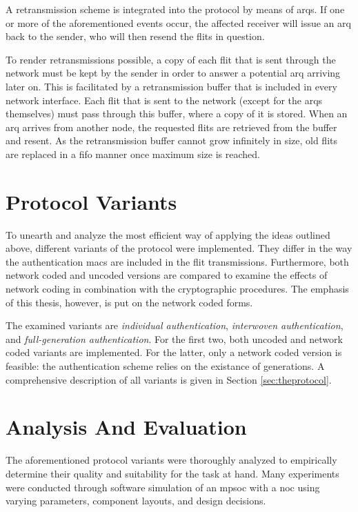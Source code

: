 A retransmission scheme is integrated into the protocol by means of \glspl{arq}. If one or more of the aforementioned events occur, the affected
receiver will issue an \gls{arq} back to the sender, who will then resend the flits in question.

To render retransmissions possible, a copy of each flit that is sent through the network must be kept by the sender in order to answer a potential
\gls{arq} arriving later on. This is facilitated by a retransmission buffer that is included in every network interface. Each flit that is sent to the
network (except for the \glspl{arq} themselves) must pass through this buffer, where a copy of it is stored. When an \gls{arq} arrives from another
node, the requested flits are retrieved from the buffer and resent. As the retransmission buffer cannot grow infinitely in size, old flits are
replaced in a \gls{fifo} manner once maximum size is reached.

\section{Protocol Variants}\label{sec:protocolvariants}
To unearth and analyze the most efficient way of applying the ideas outlined above, different variants of the protocol were implemented. They differ
in the way the authentication \glspl{mac} are included in the flit transmissions. Furthermore, both network coded and uncoded versions are compared to
examine the effects of network coding in combination with the cryptographic procedures. The emphasis of this thesis, however, is put on the network
coded forms.

The examined variants are \textit{individual authentication}, \textit{interwoven authentication}, and \textit{full-generation authentication}. For the
first two, both uncoded and network coded variants are implemented. For the latter, only a network coded version is feasible: the authentication
scheme relies on the existance of generations. A comprehensive description of all variants is given in Section
\ref{sec:theprotocol}. %

\section{Analysis And Evaluation}
The aforementioned protocol variants were thoroughly analyzed to empirically determine their quality and suitability for the task at hand. Many
experiments were conducted through software simulation of an \gls{mpsoc} with a \gls{noc} using varying parameters, component layouts, and design
decisions.

